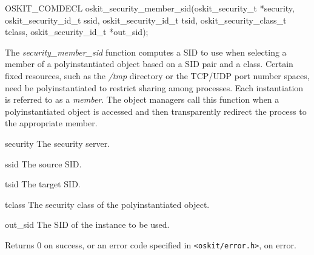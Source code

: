 \begin{apisyn}

	\funcproto OSKIT_COMDECL
	oskit_security_member_sid(oskit_security_t *security, 
		          oskit_security_id_t ssid,
			  oskit_security_id_t tsid,
                          oskit_security_class_t tclass,
			\outparam oskit_security_id_t *out_sid);
\end{apisyn}
\begin{apidesc}

The \emph{security\_member\_sid} function computes a SID to use when
selecting a member of a polyinstantiated object based on a SID pair  
and a class.  Certain fixed resources, such as the \emph{/tmp}
directory or the TCP/UDP port number spaces, need be polyinstantiated
to restrict sharing among processes.  Each instantiation is referred
to as a \emph{member}.  The object managers call this function
when a polyinstantiated object is accessed and then transparently
redirect the process to the appropriate member.

\end{apidesc}
\begin{apiparm}
	\item[security]
		The security server.
	\item[ssid]
		The source SID.
	\item[tsid]
		The target SID.
	\item[tclass]
		The security class of the polyinstantiated object.
	\item[out_sid]
		The SID of the instance to be used.
\end{apiparm}
\begin{apiret}
	Returns 0 on success, or an error code specified in
	{\tt <oskit/error.h>}, on error.
\end{apiret}


